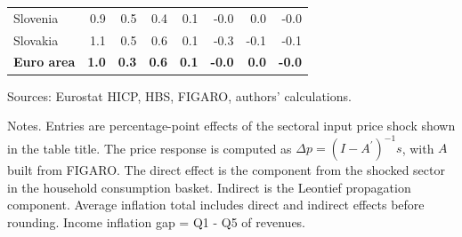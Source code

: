 \begin{table}[H]
\begin{tabular}{lrrrrrrr}
 \\
Slovenia & 0.9 & 0.5 & 0.4 & 0.1 & -0.0 & 0.0 & -0.0
 \\
Slovakia & 1.1 & 0.5 & 0.6 & 0.1 & -0.3 & -0.1 & -0.1
 \\
\midrule
\textbf{Euro area} & \textbf{1.0} & \textbf{0.3} & \textbf{0.6} & \textbf{0.1} & \textbf{-0.0} & \textbf{0.0} & \textbf{-0.0}
 \\
\bottomrule
\end{tabular}
\par\vspace{0.35em}\footnotesize\noindent Sources: Eurostat HICP, HBS, FIGARO, authors' calculations.
\par\vspace{0.25em}\footnotesize\noindent Notes. Entries are percentage-point effects of the sectoral input price shock shown in the table title. The price response is computed as $\Delta p = (I - A^{\prime})^{-1}s$, with $A$ built from FIGARO. The direct effect is the component from the shocked sector in the household consumption basket. Indirect is the Leontief propagation component. Average inflation total includes direct and indirect effects before rounding. Income inflation gap = Q1 - Q5 of revenues.
\end{table}
\vspace{0.6em}
